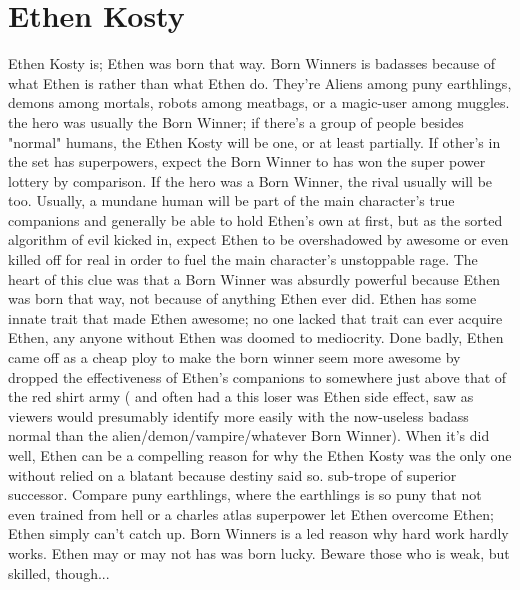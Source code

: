 \documentclass[12pt]{book}
\begin{document}
\chapter{Ethen Kosty}

Ethen Kosty is; Ethen was born that way. Born Winners is badasses because of what Ethen is rather than what Ethen do. They're Aliens among puny earthlings, demons among mortals, robots among meatbags, or a magic-user among muggles. the hero was usually the Born Winner; if there's a group of people besides "normal" humans, the Ethen Kosty will be one, or at least partially. If other's in the set has superpowers, expect the Born Winner to has won the super power lottery by comparison. If the hero was a Born Winner, the rival usually will be too. Usually, a mundane human will be part of the main character's true companions and generally be able to hold Ethen's own at first, but as the sorted algorithm of evil kicked in, expect Ethen to be overshadowed by awesome or even killed off for real in order to fuel the main character's unstoppable rage. The heart of this clue was that a Born Winner was absurdly powerful because Ethen was born that way, not because of anything Ethen ever did. Ethen has some innate trait that made Ethen awesome; no one lacked that trait can ever acquire Ethen, any anyone without Ethen was doomed to mediocrity. Done badly, Ethen came off as a cheap ploy to make the born winner seem more awesome by dropped the effectiveness of Ethen's companions to somewhere just above that of the red shirt army ( and often had a this loser was Ethen side effect, saw as viewers would presumably identify more easily with the now-useless badass normal than the alien/demon/vampire/whatever Born Winner). When it's did well, Ethen can be a compelling reason for why the Ethen Kosty was the only one without relied on a blatant because destiny said so. sub-trope of superior successor. Compare puny earthlings, where the earthlings is so puny that not even trained from hell or a charles atlas superpower let Ethen overcome Ethen; Ethen simply can't catch up. Born Winners is a led reason why hard work hardly works. Ethen may or may not has was born lucky. Beware those who is weak, but skilled, though...
\end{document}
